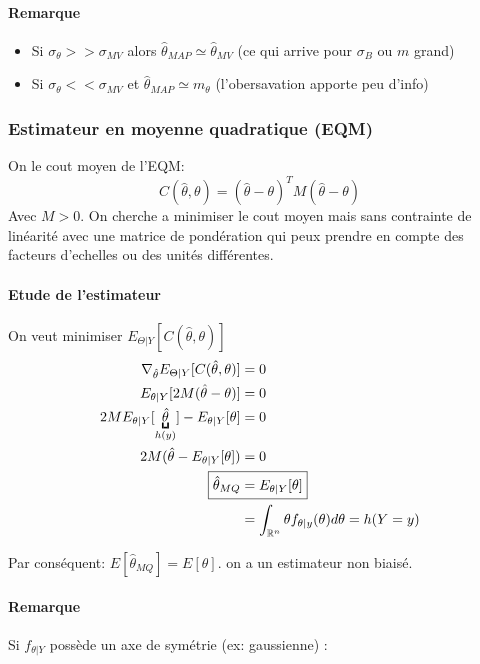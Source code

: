 \documentclass[main.tex]{subfiles}
\begin{document}
\paragraph{Remarque}
\begin{itemize}
\item Si $\sigma_\theta>>\sigma_{MV}$ alors $\hat{\theta}_{MAP}\simeq \hat{\theta}_{MV}$ (ce qui arrive pour $\sigma_B$ ou $m$ grand)
\item Si $\sigma_\theta<<\sigma_{MV}$ et $\hat{\theta}_{MAP} \simeq m_\theta$ (l'obersavation apporte peu d'info)
\end{itemize}

\subsubsection{Estimateur en moyenne quadratique (EQM)}

\begin{defin}
  On le cout moyen de l'EQM:
  \[
    C(\hat{\theta},\theta) = (\hat{\theta}-\theta)^T M (\hat{\theta}-\theta)
  \]
  Avec $M>0$.
  On cherche a minimiser le cout moyen mais sans contrainte de linéarité avec une matrice de pondération qui peux prendre en compte des facteurs d'echelles ou des unités différentes.
\end{defin}


\paragraph{Etude de l'estimateur} On veut minimiser $E_{\Theta|Y}[C(\hat{\theta},\theta)]$
\begin{align*}
  \nabla_{\hat{\theta}}E_{\Theta|Y}[C(\hat{\theta},\theta)] &= 0 \\
  E_{\theta|Y}[2M(\hat{\theta}-\theta)] &= 0 \\
  2M E_{\theta|Y}[\underbracket{\hat{\theta}}_{h(y)}]-E_{\theta|Y}[\theta]&=0 \\
  2M(\hat{\theta}-E_{\theta|Y}[\theta]) &= 0 \\
  \Aboxed{ \hat{\theta}_{MQ} &=E_{\theta|Y}[\theta]} \\
                          &= \int_{\R^n}\theta f_{\theta|y}(\theta)d\theta = h(Y=y)
\end{align*}

Par conséquent: $E[\hat{\theta}_{MQ}]=E[\theta]$. on a un estimateur non biaisé.
\paragraph{Remarque}
Si $f_{\theta|Y}$ possède un axe de symétrie (ex: gaussienne) :
\end{document}
